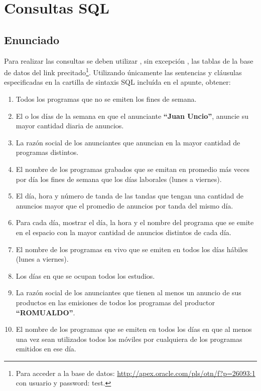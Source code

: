 \documentclass[a4paper,10pt]{article}
\begin{document}
\pagestyle{fancy}


\section*{Consultas SQL}

\subsection*{Enunciado}

 Para realizar las consultas se deben utilizar , sin excepción , las
  tablas de la base de datos del link precitado\footnote{Para acceder a la base de datos:  \href{http://apex.oracle.com/pls/otn/f?p=26093:1}{http://apex.oracle.com/pls/otn/f?p=26093:1} con usuario y password: test. }.  Utilizando
  únicamente las sentencias y cláusulas especificadas en la cartilla
  de sintaxis SQL incluída en el apunte, obtener:

\begin{enumerate}
\item Todos los programas que no se emiten los fines de semana.
\item El o los días de la semana en que el anunciante \textbf{“Juan Uncio”},
     anuncie su mayor cantidad diaria de anuncios.
\item La razón social de los anunciantes que anuncian en la mayor
     cantidad de programas distintos.
\item El nombre de los programas grabados que se emitan en promedio más
     veces por día los fines de semana que los días laborales (lunes a
     viernes).
\item El día, hora y número de tanda de las tandas que tengan una
     cantidad de anuncios mayor que el promedio de anuncios por tanda
     del mismo día.
\item Para cada día, mostrar el día, la hora y el nombre del programa
     que se emite en el espacio con la mayor cantidad de anuncios
     distintos de cada día.
\item El nombre de los programas en vivo que se emiten en todos los
     días hábiles (lunes a viernes).
\item Los días en que se ocupan todos los estudios.
\item La razón social de los anunciantes que tienen al menos un anuncio
     de sus productos en las emisiones de todos los programas del
     productor \textbf{“ROMUALDO”}.
\item El nombre de los programas que se emiten en todos los días en
      que al menos una vez sean utilizados todos los móviles por
      cualquiera de los programas emitidos en ese día.
\end{enumerate}
\newpage
\end{document}

